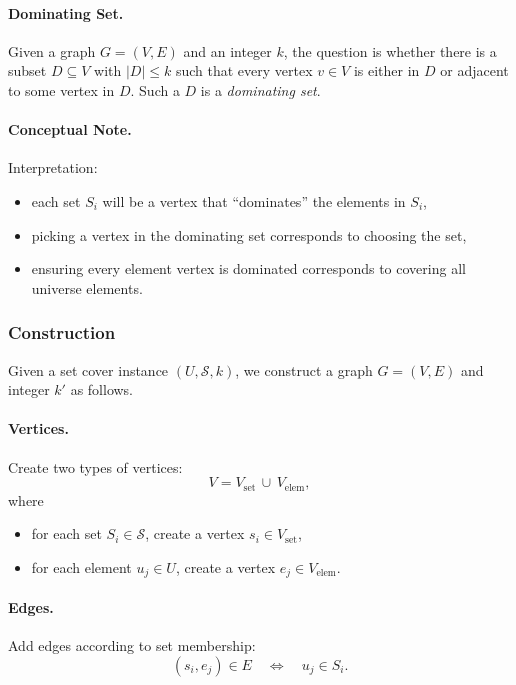 \documentclass[9pt]{extarticle}
\begin{document}
\paragraph{Dominating Set.}
Given a graph $G=(V,E)$ and an integer $k$, the question is whether there is a
subset $D \subseteq V$ with $|D| \le k$ such that every vertex $v \in V$ is
either in $D$ or adjacent to some vertex in $D$.  Such a $D$ is a
\emph{dominating set}.

\paragraph{Conceptual Note.}
Interpretation:
\begin{itemize}
    \item each set $S_i$ will be a vertex that “dominates” the elements in $S_i$,
    \item picking a vertex in the dominating set corresponds to choosing the set,
    \item ensuring every element vertex is dominated corresponds to covering all
          universe elements.
\end{itemize}

\subsubsection*{Construction}

Given a set cover instance $(U,\mathcal{S},k)$, we construct a graph
$G = (V,E)$ and integer $k'$ as follows.

\paragraph{Vertices.}
Create two types of vertices:
\[
    V = V_{\text{set}} \,\cup\, V_{\text{elem}},
\]
where
\begin{itemize}
    \item for each set $S_i \in \mathcal{S}$, create a vertex $s_i \in V_{\text{set}}$,
    \item for each element $u_j \in U$, create a vertex $e_j \in V_{\text{elem}}$.
\end{itemize}

\paragraph{Edges.}
Add edges according to set membership:
\[
    (s_i, e_j) \in E \quad\Longleftrightarrow\quad u_j \in S_i.
\]
\end{document}
